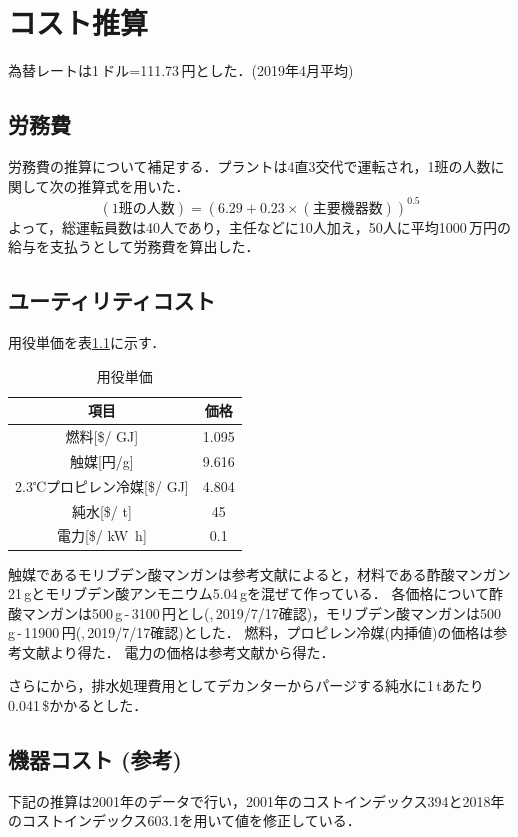 \documentclass[a4j]{jsreport}
\begin{document}
\appendix
\chapter{コスト推算}
為替レートは1\,ドル=111.73\,円とした．(2019年4月平均)

\section{労務費}
労務費の推算について補足する．プラントは4直3交代で運転され，1班の人数に関して次の推算式を用いた．
\begin{equation}
    (1班の人数) = (6.29 + 0.23 \times (主要機器数))^{0.5}
\end{equation}
よって，総運転員数は40人であり，主任などに10人加え，50人に平均1000\,万円の給与を支払うとして労務費を算出した．

\section{ユーティリティコスト}
用役単価を表\ref{用役単価}に示す．
\begin{table}[htbp]
  \centering
  \caption{用役単価}
  \label{用役単価}
  \begin{tabular}{cc}
    \hline
    項目 & 価格 \\
    \hline
    燃料[\$/ \si{\giga \joule}] & 1.095 \\
    触媒[円/g] & 9.616 \\
    2.3℃プロピレン冷媒[\$/ \si{\giga \joule}] & 4.804 \\
    純水[\$/ \si{\tonne}] & 45 \\
    電力[\$/ \si{\kilo \watt \hour}] & 0.1 \\
    \hline
  \end{tabular}
\end{table}
触媒であるモリブデン酸マンガンは参考文献\cite{Li2019}によると，材料である酢酸マンガン21\,gとモリブデン酸アンモニウム5.04\,gを混ぜて作っている．
各価格について酢酸マンガンは500\,g\,-\,3100\,円とし(\cite{酢酸マンガン},\,2019/7/17確認)，モリブデン酸マンガンは500\,g\,-\,11900\,円(\cite{モリブデン酸アンモニウム},\,2019/7/17確認)とした．
燃料，プロピレン冷媒(内挿値)の価格は参考文献\cite{プロセスデザインコンテスト10}より得た．
電力の価格は参考文献\cite{講義資料3}から得た．

さらに\cite{講義資料3}から，排水処理費用としてデカンターからパージする純水に1\,\si{\tonne}あたり0.041\,\$かかるとした．

\section{機器コスト (参考\cite{講義資料3})}
下記の推算は2001年のデータで行い，2001年のコストインデックス394と2018年のコストインデックス603.1を用いて値を修正している．
\end{document}
